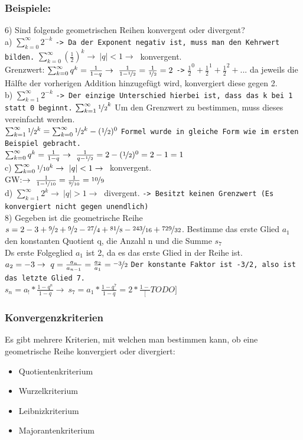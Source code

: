 \documentclass{article}
\begin{document}
	\subsubsection{Beispiele:}
	6) Sind folgende geometrischen Reihen konvergent oder divergent? \\
	a) $\sum^{\infty}_{k=0}{2^{-k}}$ \verb|-> Da der Exponent negativ ist, muss man den Kehrwert bilden.| $\sum^{\infty}_{k=0}{(\frac{1}{2})^k}\to\ |q|<1\to\ $ konvergent. \\
	Grenzwert: $\sum^{\infty}_{k=0}{q^k}=\frac{1}{1-q}\to\ \frac{1}{1-\nicefrac{1}{2}}=\frac{1}{\nicefrac{1}{2}}=2$ \verb|->| $\frac{1}{2}^0+\frac{1}{2}^1+\frac{1}{2}^2+...$ da jeweils die Hälfte der vorherigen Addition hinzugefügt wird, konvergiert diese gegen 2. \\
	b) $\sum^{\infty}_{k=1}{2^{-k}}$ \verb|-> Der einzige Unterschied hierbei ist, dass das k bei 1 statt 0 beginnt.| $\sum^{\infty}_{k=1}{\nicefrac{1}{2}}^k$ Um den Grenzwert zu bestimmen, muss dieses vereinfacht werden. \\
	$\sum^{\infty}_{k=1}{\nicefrac{1}{2}^k}=\sum^{\infty}_{k=0}{\nicefrac{1}{2}^k}-(\nicefrac{1}{2})^0$ \verb|Formel wurde in gleiche Form wie im ersten Beispiel gebracht.| \\
	$\sum^{\infty}_{k=0}{q^k}=\frac{1}{1-q}\to\ \frac{1}{q-\nicefrac{1}{2}}=2-(\nicefrac{1}{2})^0=2-1 = 1$ \\
	c) $\sum^{\infty}_{k=0}{\nicefrac{1}{10}^k}\to\ |q|<1\to\ $ konvergent. \\
	GW:$\to\ \frac{1}{1-\nicefrac{1}{10}}=\frac{1}{\nicefrac{9}{10}}=\nicefrac{10}{9}$ \\
	d) $\sum^{\infty}_{k=1}{2^k}\to\ |q|>1\to\ $ divergent. \verb|-> Besitzt keinen Grenzwert (Es konvergiert nicht gegen unendlich)| \\
	8) Gegeben ist die geometrische Reihe $s=2-3+\nicefrac{9}{2}+\nicefrac{9}{2}-\nicefrac{27}{4}+\nicefrac{81}{8}-\nicefrac{243}{16}+\nicefrac{729}{32}$. Bestimme das erste Glied $a_1$ den konstanten Quotient q, die Anzahl n und die Summe $s_7$ \\
	Ds erste Folgeglied $a_1$ ist 2, da es das erste Glied in der Reihe ist. $a_2=-3\to\ q=\frac{a_n}{a_{n-1}}=\frac{a_2}{a_1}=\nicefrac{-3}{2}$ \verb|Der konstante Faktor ist -3/2, also ist das letzte Glied 7.| \\
	$s_n=a_!*\frac{1-q^n}{1-q}\to\ s_7=a_1*\frac{1-q^7}{1-q}=2*\frac{1-}[TODO]$
	\subsubsection{Konvergenzkriterien}
	Es gibt mehrere Kriterien, mit welchen man bestimmen kann, ob eine geometrische Reihe konvergiert oder divergiert:
	\begin{itemize}
		\item{Quotientenkriterium}
		\item{Wurzelkriterium}
		\item{Leibnizkriterium}
		\item{Majorantenkriterium}
	\end{itemize}
\end{document}
